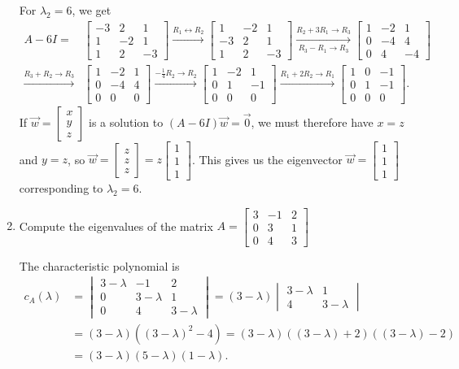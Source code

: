 \documentclass[12pt]{article}
\newcommand{\bbm}{\begin{bmatrix}}
\newcommand{\ebm}{\end{bmatrix}}
\newcommand{\bvm}{\begin{vmatrix}}
\newcommand{\evm}{\end{vmatrix}}
\begin{document}
\begin{enumerate}
\medskip

For $\lambda_2=6$, we get
\begin{align*}
A-6I = &\bbm -3&2&1\\1&-2&1\\1&2&-3\ebm \xrightarrow{R_1\leftrightarrow R_2} \bbm 1&-2&1\\-3&2&1\\1&2&-3\ebm\xrightarrow[R_3-R_1\to R_3]{R_2+3R_1\to R_3} \bbm 1&-2&1\\0&-4&4\\0&4&-4\ebm\\
\xrightarrow{R_3+R_2\to R_3}&\bbm 1&-2&1\\0&-4&4\\0&0&0\ebm \xrightarrow{-\frac14 R_2\to R_2}\bbm 1&-2&1\\0&1&-1\\0&0&0\ebm \xrightarrow{R_1+2R_2\to R_1}\bbm 1&0&-1\\0&1&-1\\0&0&0\ebm.
\end{align*}
If $\vec{w}=\bbm x\\y\\z\ebm$ is a solution to $(A-6I)\vec{w}=\vec{0}$, we must therefore have $x=z$ and $y=z$, so $\vec{w} = \bbm z\\z\\z\ebm = z\bbm 1\\1\\1\ebm$. This gives us the eigenvector $\vec{w} = \bbm 1\\1\\1\ebm$ corresponding to $\lambda_2=6$.
\newpage

\item Compute the eigenvalues of the matrix $A = \bbm 3&-1&2\\0&3&1\\0&4&3\ebm$

\bigskip

The characteristic polynomial is
\begin{align*}
c_A(\lambda) &= \bvm 3-\lambda & -1 &2\\0&3-\lambda &1\\0&4&3-\lambda \evm = (3-\lambda)\bvm 3-\lambda &1\\4&3-\lambda\evm\\
& = (3-\lambda)((3-\lambda)^2-4)=(3-\lambda)((3-\lambda)+2)((3-\lambda)-2)\\
& = (3-\lambda)(5-\lambda)(1-\lambda).
\end{align*}


\end{enumerate}
\end{document}
